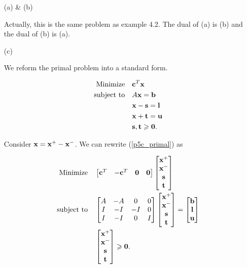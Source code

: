 \documentclass[12pt]{article}
\begin{document}
\begin{enumerate}
\item [(a) \& (b)]

Actually, this is the same problem as example 4.2. The dual of (a) is (b) and the dual of (b) is (a).

\item [(c)]

We reform the primal problem into a standard form.

\begin{equation}\label{p5c_primal}
\begin{aligned}
 \quad \text{Minimize} \quad & \textbf c^T\textbf x\\
\text{subject\  to} \quad & A\textbf x = \textbf b \\
& \textbf x - \textbf s = \textbf l \\
& \textbf x + \textbf t = \textbf u \\
& \textbf s, \textbf t \geqslant \textbf 0.
\end{aligned}
\end{equation}

Consider $\textbf x = \textbf x^+ - \textbf x^-$. We can rewrite (\ref{p5c_primal}) as

\begin{equation}\label{p5c_primal_std}
\begin{aligned}
\quad \text{Minimize} \quad & \begin{bmatrix}
\textbf c^T & -\textbf c^T & \textbf 0 & \textbf 0
\end{bmatrix}\begin{bmatrix}
\textbf x^+ \\ \textbf x^- \\ \textbf s \\ \textbf t
\end{bmatrix}\\
\text{subject\  to} \quad &\begin{bmatrix}
A & -A & 0 & 0 \\
I & -I & -I & 0 \\
I & -I & 0 & I
\end{bmatrix}
\begin{bmatrix}
\textbf x^+ \\ \textbf x^- \\ \textbf s \\ \textbf t
\end{bmatrix} = \begin{bmatrix}
\textbf b \\ \textbf l \\ \textbf u
\end{bmatrix} \\
&  \begin{bmatrix}
\textbf x^+ \\ \textbf x^- \\ \textbf s \\ \textbf t
\end{bmatrix}\geqslant \textbf 0.
\end{aligned}
\end{equation}


\end{enumerate}
\end{document}

